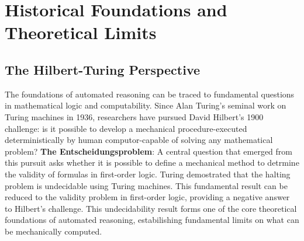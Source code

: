\documentclass[a4paper]{article}
\theoremstyle{definition}
\begin{document}
\section{Historical Foundations and Theoretical Limits}
\subsection{The Hilbert-Turing Perspective}
The foundations of automated reasoning can be traced to fundamental questions in mathematical
logic and computability. Since Alan Turing's seminal work on Turing machines in 1936, researchers have
pursued David Hilbert's 1900 challenge: is it possible to develop a mechanical
procedure-executed deterministically by human computor-capable of solving any mathematical problem?
\vspace{1em}
\noindent 
\newline
\textbf{The Entscheidungsproblem}: A central question that emerged from this pursuit asks whether it is 
possible to define a mechanical method to detrmine the validity of formulas in first-order logic.
\vspace{1em}
\noindent 
\newline
Turing demostrated that the halting problem is undecidable using Turing machines. This fundamental result can be reduced to the validity
problem in first-order logic, providing a negative answer to Hilbert's challenge. This undecidability result forms one of the core theoretical
foundations of automated reasoning, estabilishing fundamental limits on what can be mechanically computed.
\end{document}
